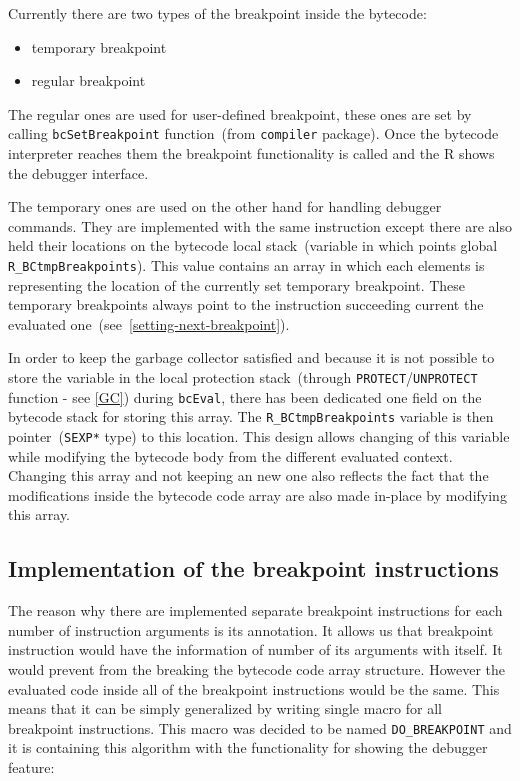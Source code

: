 \documentclass[thesis=M,english]{FITthesis}[2018/10/20]
\newcommand{\code}[1]{\texttt{#1}}
\begin{document}
Currently there are two types of the breakpoint inside the bytecode:

\begin{itemize}
	\item temporary breakpoint
	\item regular breakpoint
\end{itemize}

The regular ones are used for user-defined breakpoint, these ones are set by calling \code{bcSetBreakpoint} function~(from \code{compiler} package). Once the bytecode interpreter reaches them the breakpoint functionality is called and the R shows the debugger interface.

The temporary ones are used on the other hand for handling debugger commands. They are implemented with the same instruction except there are also held their locations on the bytecode local stack~(variable in which points global \code{R{\_}BCtmpBreakpoints}). This value contains an array in which each elements is representing the location of the currently set temporary breakpoint. These temporary breakpoints always point to the instruction succeeding current the evaluated one~(see~\ref{setting-next-breakpoint}).

In order to keep the garbage collector satisfied and because it is not possible to store the variable in the local protection stack~(through \code{PROTECT}/\code{UNPROTECT} function - see \ref{GC}) during \code{bcEval}, there has been dedicated one field on the bytecode stack for storing this array. The \code{R{\_}BCtmpBreakpoints} variable is then pointer~(\code{SEXP*} type) to this location. This design allows changing of this variable while modifying the bytecode body from the different evaluated context. Changing this array and not keeping an new one also reflects the fact that the modifications inside the bytecode code array are also made in-place by modifying this array.

\subsection{Implementation of the breakpoint instructions}\label{implementation-of-breakpoint-instruction}

The reason why there are implemented separate breakpoint instructions for each number of instruction arguments is its annotation. It allows us that breakpoint instruction would have the information of number of its arguments with itself. It would prevent from the breaking the bytecode code array structure. However the evaluated code inside all of the breakpoint instructions would be the same. This means that it can be simply generalized by writing single macro for all breakpoint instructions. This macro was decided to be named \code{DO{\_}BREAKPOINT} and it is containing this algorithm with the functionality for showing the debugger feature:
\end{document}
